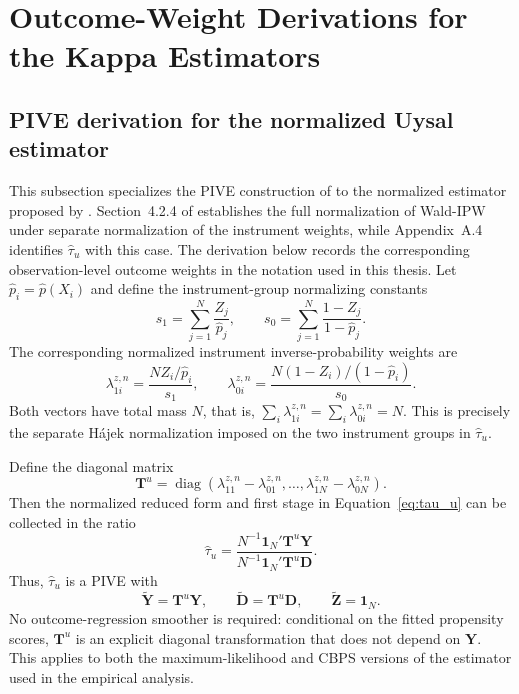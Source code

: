 \documentclass[12pt, a4paper, oneside]{article}
\theoremstyle{plain}
\theoremstyle{definition}
\begin{document}
\section{Outcome-Weight Derivations for the Kappa Estimators}
\label{app:kappa_outcome_weight_derivations}


\subsection{PIVE derivation for the normalized Uysal estimator}
\label{app:uysal_outcome_weights}

This subsection specializes the PIVE construction of
\citet{knaus2024treatment} to the normalized estimator proposed by
\citet{uysal2011three}. Section~4.2.4 of \citet{knaus2024treatment} establishes
the full normalization of Wald-IPW under separate normalization of the
instrument weights, while Appendix~A.4 identifies \(\widehat{\tau}_u\) with
this case. The derivation below records the corresponding observation-level
outcome weights in the notation used in this thesis. Let \(\widehat p_i=\widehat p(X_i)\) and define the
instrument-group normalizing constants
\begin{equation}
    s_1=\sum_{j=1}^{N}\frac{Z_j}{\widehat p_j},
    \qquad
    s_0=\sum_{j=1}^{N}\frac{1-Z_j}{1-\widehat p_j}.
    \label{eq:u_s1_s0}
\end{equation}
The corresponding normalized instrument inverse-probability weights are
\begin{equation}
    \lambda_{1i}^{z,n}
    =\frac{N Z_i/\widehat p_i}{s_1},
    \qquad
    \lambda_{0i}^{z,n}
    =\frac{N(1-Z_i)/(1-\widehat p_i)}{s_0}.
    \label{eq:u_norm_lambda}
\end{equation}
Both vectors have total mass \(N\), that is,
\(\sum_i\lambda_{1i}^{z,n}=\sum_i\lambda_{0i}^{z,n}=N\). This is precisely
the separate H\'ajek normalization imposed on the two instrument groups in
\(\widehat\tau_u\).

Define the diagonal matrix
\begin{equation}
    \mathbf T^u
    =\operatorname{diag}\!\left(
      \lambda_{11}^{z,n}-\lambda_{01}^{z,n},\ldots,
      \lambda_{1N}^{z,n}-\lambda_{0N}^{z,n}
    \right).
    \label{eq:u_T_matrix}
\end{equation}
Then the normalized reduced form and first stage in
Equation~\eqref{eq:tau_u} can be collected in the ratio
\begin{equation}
    \widehat\tau_u
    =\frac{N^{-1}\mathbf 1_N'\mathbf T^u\mathbf Y}
           {N^{-1}\mathbf 1_N'\mathbf T^u\mathbf D}.
    \label{eq:u_wald_matrix}
\end{equation}
Thus, \(\widehat\tau_u\) is a PIVE with
\begin{equation}
    \widetilde{\mathbf Y}=\mathbf T^u\mathbf Y,
    \qquad
    \widetilde{\mathbf D}=\mathbf T^u\mathbf D,
    \qquad
    \widetilde{\mathbf Z}=\mathbf 1_N.
    \label{eq:u_pive_components}
\end{equation}
No outcome-regression smoother is required: conditional on the fitted
propensity scores, \(\mathbf T^u\) is an explicit diagonal transformation that
does not depend on \(\mathbf Y\). This applies to both the maximum-likelihood
and CBPS versions of the estimator used in the empirical analysis.
\end{document}
